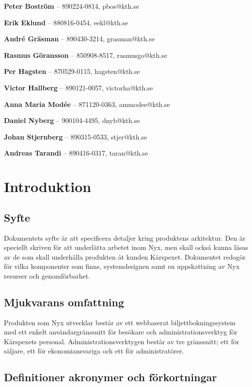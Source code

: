 \documentclass[a4paper, twoside, 11pt, titlepage]{article}
\begin{document}
\textbf{Peter Boström} -- 890224-0814, pbos@kth.se

\textbf{Erik Eklund} -- 880816-0454, eekl@kth.se

\textbf{André Gräsman} -- 890430-3214, grasman@kth.se

\textbf{Rasmus Göransson} -- 850908-8517, rasmusgo@kth.se

\textbf{Per Hagsten} -- 870529-0115, hagsten@kth.se

\textbf{Victor Hallberg} -- 890121-0057, victorha@kth.se

\textbf{Anna Maria Modée} -- 871120-0363, ammodee@kth.se

\textbf{Daniel Nyberg} -- 900104-4495, dnyb@kth.se

\textbf{Johan Stjernberg} -- 890315-0533, stjer@kth.se

\textbf{Andreas Tarandi} -- 890416-0317, taran@kth.se

\clearpage \tableofcontents \clearpage

\clearpage
\section{Introduktion}



	\subsection{Syfte}


	Dokumentets syfte är att specificera detaljer kring produktens arkitektur. Den är speciellt skriven för att underlätta arbetet inom Nyx, men skall också kunna läsas av de som skall underhålla produkten åt kunden Kårspexet. Dokumentet redogör för vilka komponenter som finns, systemdesignen samt en uppskattning av Nyx resurser och genomförbarhet.

	\subsection{Mjukvarans omfattning}


	Produkten som Nyx utvecklar består av ett webbaserat biljettbokningssystem med ett enkelt användargränssnitt för besökare och administrationsverktyg för Kårspexets personal. Administrationsverktygen består av tre gränssnitt; ett för säljare, ett för ekonomiansvariga och ett för administratörer.

	\subsection{Definitioner akronymer och förkortningar}
\end{document}
